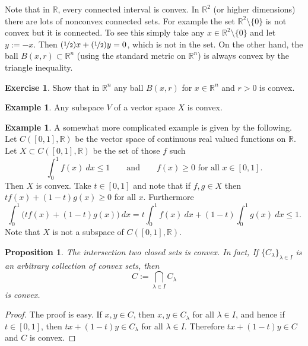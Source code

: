 \documentclass[12pt]{book}
\newcommand{\R}{{\mathbb{R}}}
\theoremstyle{plain}
\newtheorem{prop}[thm]{Proposition}
\theoremstyle{remark}
\theoremstyle{definition}
\theoremstyle{exercise}
\newtheorem{exercise}{Exercise}[section]
\theoremstyle{example}
\newtheorem{example}[thm]{Example}
\begin{document}
Note that in $\R$, every connected interval is convex.  In $\R^2$ (or higher
dimensions) there are lots of nonconvex connected sets.  For example
the set $\R^2 \setminus \{0\}$ is not convex but it is connected.  To see
this simply take any $x \in \R^2 \setminus \{0\}$ and let $y:=-x$.
Then $(\nicefrac{1}{2})x + (\nicefrac{1}{2})y = 0$, which is not in the set.
On the other hand, the ball $B(x,r) \subset \R^n$ (using the standard metric
on $\R^n$)
is always convex by the triangle inequality.

\begin{exercise}
Show that in $\R^n$ any ball $B(x,r)$ for $x \in \R^n$ and $r > 0$ is
convex.
\end{exercise}

\begin{example}
Any subspace $V$ of a vector space $X$ is convex.
\end{example}

\begin{example}
A somewhat more complicated example is given by the following.  Let
$C([0,1],\R)$ be the vector space of continuous real valued functions on $\R$.
Let $X \subset C([0,1],\R)$ be the set of those $f$ such  
\begin{equation*}
\int_0^1 f(x)~dx \leq 1 \qquad \text{and} \qquad
f(x) \geq 0 \text{ for all $x \in [0,1]$} .
\end{equation*}
Then $X$ is convex.  Take $t \in [0,1]$ and note that if $f,g \in X$
then $t f(x) + (1-t) g(x) \geq 0$ for all $x$.  Furthermore
\begin{equation*}
\int_0^1 \bigl(tf(x) + (1-t)g(x)\bigr) ~dx
=
t \int_0^1 f(x) ~dx
+ (1-t)\int_0^1 g(x) ~dx \leq 1 .
\end{equation*}
Note that $X$ is not a subspace of $C([0,1],\R)$.
\end{example}

\begin{prop}
The intersection two closed sets is convex.  In fact,
If $\{ C_\lambda \}_{\lambda \in I}$ is
an arbitrary collection of convex sets, then
\begin{equation*}
C := \bigcap_{\lambda \in I} C_\lambda
\end{equation*}
is convex.
\end{prop}

\begin{proof}
The proof is easy.  If $x, y \in C$, then $x,y \in C_\lambda$ for all
$\lambda \in I$, and hence if $t \in [0,1]$, then $tx + (1-t)y \in
C_\lambda$ for all $\lambda \in I$.  Therefore $tx + (1-t)y \in C$ and $C$
is convex.
\end{proof}
\end{document}
